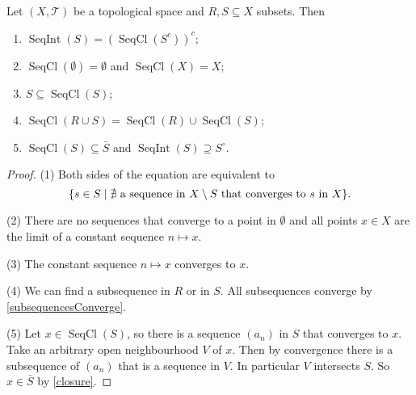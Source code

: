 \begin{lemma} \label{sequentialInteriorClosure}
Let $(X,\mathcal{T})$ be a topological space and $R,S\subseteq X$  subsets. Then
\begin{enumerate}
\item $\operatorname{SeqInt}(S) = (\operatorname{SeqCl}(S^c))^c$;
\item $\operatorname{SeqCl}(\emptyset) = \emptyset$ and $\operatorname{SeqCl}(X) = X$;
\item $S\subseteq \operatorname{SeqCl}(S)$;
\item $\operatorname{SeqCl}(R\cup S) = \operatorname{SeqCl}(R)\cup \operatorname{SeqCl}(S)$;
\item $\operatorname{SeqCl}(S) \subseteq \bar{S}$ and $\operatorname{SeqInt}(S) \supseteq S^\circ$.
\end{enumerate}
\end{lemma}
\begin{proof}
(1) Both sides of the equation are equivalent to
\[ \setbuilder{s\in S}{\text{$\nexists$ a sequence in $X\setminus S$ that converges to $s$ in $X$}}. \]

(2) There are no sequences that converge to a point in $\emptyset$ and all points $x\in X$ are the limit of a constant sequence $n\mapsto x$.

(3) The constant sequence $n\mapsto x$ converges to $x$.

(4) We can find a subsequence in $R$ or in $S$. All subsequences converge by \ref{subsequencesConverge}.

(5) Let $x\in \operatorname{SeqCl}(S)$, so there is a sequence $(a_n)$ in $S$ that converges to $x$. Take an arbitrary open neighbourhood $V$ of $x$. Then by convergence there is a subsequence of $(a_n)$ that is a sequence in $V$. In particular $V$ intersects $S$. So $x\in \bar{S}$ by \ref{closure}.
\end{proof}

